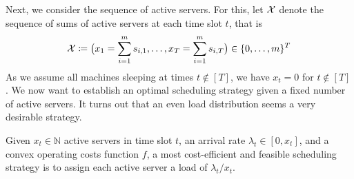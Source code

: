 Next, we consider the sequence of active servers. For this, let $\mathcal{X}$ denote the sequence of sums of active servers at each time slot $t$, that is
\begin{equation*}
	\mathcal{X}\coloneqq\bigl(x_1=\sum\limits_{i=1}^{m}s_{i,1},\dotsc,x_T=\sum\limits_{i=1}^{m}s_{i,T}\bigr)\in\{0,\dotsc,m\}^T
\end{equation*}
As we assume all machines sleeping at times $t\notin[T]$, we have $x_t=0$ for $t\notin[T]$. We now want to establish an optimal scheduling strategy given a fixed number of active servers. It turns out that an even load distribution seems a very desirable strategy.\begin{prop}\label{prop:even_load_distribution}
Given $x_t\in\mathbb{N}$ active servers in time slot $t$, an arrival rate $\lambda_t\in[0,x_t]$, and a convex operating costs function $f$, a most cost-efficient and feasible scheduling strategy is to assign each active server a load of $\lambda_t/x_t$.
\end{prop}
